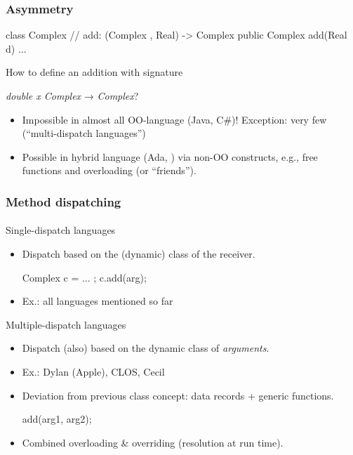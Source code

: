 \documentclass{beamer}
\begin{document}
\begin{frame}[fragile]
\frametitle{Asymmetry}
\begin{cplus3}
class Complex 
{
    // add: (Complex , Real) -> Complex  
    public Complex add(Real d) {...}
}
\end{cplus3}
How to define an addition with signature 
\begin{center}
\textit{double x Complex} → \textit{Complex}?
\end{center}
\begin{itemize}
\item Impossible in almost all OO-language (Java, C\#)!
Exception: very few (``multi-dispatch languages'') 
\item Possible in hybrid language (Ada, \Cpp) via non-OO constructs,
e.g., free functions and overloading (or ``friends''). 
\end{itemize}
\end{frame}

\begin{frame}[fragile]
\frametitle{Method dispatching}
\framesubtitle{}

Single-dispatch languages
\begin{itemize}
\item Dispatch based on the (dynamic) class of the receiver. 
\begin{cplus3}
     Complex c = ... ;   
     c.add(arg);
\end{cplus3}
\item Ex.: all languages mentioned so far

\end{itemize}

Multiple-dispatch languages
\begin{itemize}
\item Dispatch (also) based on the dynamic class of \textit{arguments}.
\item Ex.: Dylan (Apple), CLOS, Cecil
\item Deviation from previous class concept: data records + generic functions.
\begin{cplus3}
     add(arg1, arg2);
\end{cplus3}
\item Combined overloading \& overriding (resolution at run time).
\end{itemize} 
\end{frame}
\end{document}
